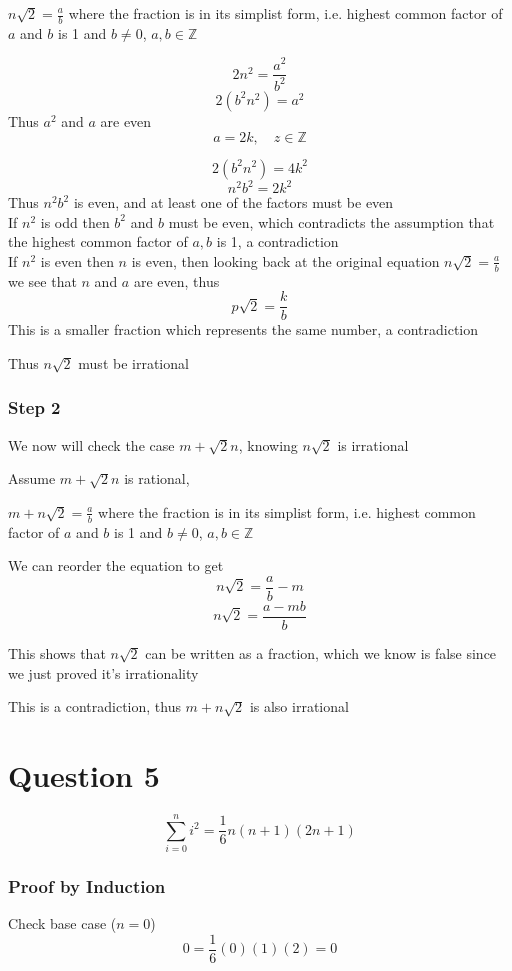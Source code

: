 \documentclass{article}
\begin{document}
\(n\sqrt{2} = \frac{a}{b}\) where the fraction is in its simplist form, i.e. highest common factor of \(a\) and \(b\) is 1 and \(b \neq 0\), \(a,b \in \mathbb{Z}\)

\[
2n^2 = \frac{a^2}{b^2}
\]
\[
2(b^2n^2) = a^2
\]
Thus \(a^2\) and \(a\) are even
\[
a = 2k, \quad z \in \mathbb{Z}
\]

\[
2(b^2n^2) = 4k^2
\]
\[
n^2b^2 = 2k^2
\]
Thus \(n^2b^2\) is even, and at least one of the factors must be even
\\

If \(n^2\) is odd then \(b^2\) and \(b\) must be even, which contradicts the assumption that the highest common 
factor of \(a,b\) is 1, a contradiction
\\

If \(n^2\) is even then \(n\) is even, then looking back at the original equation \(n\sqrt{2} = \frac{a}{b}\) we see that 
\(n\) and \(a\) are even, thus
\[
p\sqrt{2} = \frac{k}{b}
\]
This is a smaller fraction which represents the same number, a contradiction

Thus \(n\sqrt{2}\) must be irrational
\\

\subsubsection*{Step 2}
We now will check the case \(m+\sqrt{2}n\), knowing \(n\sqrt{2}\) is irrational

Assume \(m+\sqrt{2}n\) is rational, 

\( m + n\sqrt{2} = \frac{a}{b}\) where the fraction is in its simplist form, i.e. highest common factor of \(a\) and \(b\) is 1 and \(b \neq 0\), \(a,b \in \mathbb{Z}\)

We can reorder the equation to get
\[
n\sqrt{2} = \frac{a}{b} - m
\]
\[
n\sqrt{2} = \frac{a-mb}{b}
\]

This shows that \(n\sqrt{2}\) can be written as a fraction, which we know is false since we just proved it's irrationality

This is a contradiction, thus \(m + n\sqrt{2}\) is also irrational


\section*{Question 5}
\[
\sum_{i=0}^{n} i^2 = \frac{1}{6}n(n+1)(2n+1)
\]

\subsubsection*{Proof by Induction}
Check base case (\(n=0\))
\[
0 = \frac{1}{6}(0)(1)(2) = 0
\]
\end{document}
